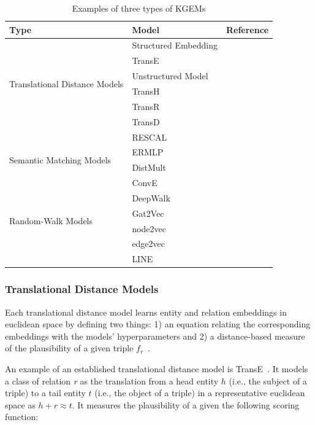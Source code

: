 \begin{table}
    \centering
    \caption{Examples of three types of \ac{KGEM}s}\label{tab:kgem_examples}
    \begin{tabular}{ l l l }
        \hline
        Type & Model & Reference \\
        \hline
        \multirow{6}{*}{Translational Distance Models}
        & Structured Embedding & ~\cite{Bordes2011}  \\
        & TransE & ~\cite{Bordes2013} \\
        & Unstructured Model & ~\cite{Bordes2014} \\
        & TransH & ~\cite{Wang2014} \\
        & TransR & ~\cite{Lin2015} \\
        & TransD & ~\cite{Ji2015} \\
        \hline
        \multirow{4}{*}{Semantic Matching Models}
        & RESCAL & ~\cite{Nickel2011} \\
        & ERMLP & ~\cite{Dong2014} \\
        & DistMult & ~\cite{Yang2014}  \\
        & ConvE & ~\cite{Dettmers2017} \\
        \hline
        \multirow{4}{*}{Random-Walk Models}
        & DeepWalk & ~\cite{Perozzi2014} \\
        & Gat2Vec & ~\cite{Sheikh2018} \\
        & node2vec & ~\cite{Grover2016} \\
        & edge2vec & ~\cite{Gao2018} \\
        & LINE & ~\cite{Tang2015} \\
        \hline
    \end{tabular}
\end{table}

\subsubsection{Translational Distance Models}

Each translational distance model learns entity and relation embeddings in euclidean space by defining two things: 1) an equation relating the corresponding embeddings with the models' hyperparameters and 2) a distance-based measure of the plausibility of a given triple $f_r$~\cite{Wang2017}.

An example of an established translational distance model is TransE~\cite{Bordes2013}.
It models a class of relation \textit{r} as the translation from a head entity $h$ (i.e., the subject of a triple) to a tail entity $t$ (i.e., the object of a triple) in a representative euclidean space as $h + r \approx t$.
It measures the plausibility of a given the following scoring function:

